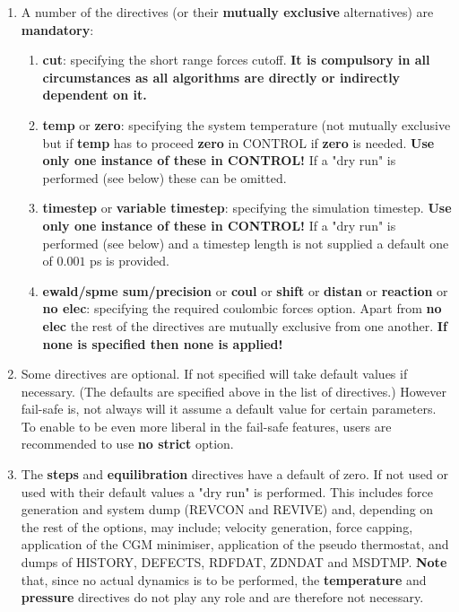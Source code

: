 \begin{enumerate}
\item A number of the directives (or their {\bf mutually
exclusive} alternatives) are {\bf mandatory}:
\begin{enumerate}
\item {\bf cut}: specifying the short range forces cutoff.  {\bf
It is compulsory in all circumstances as all \D algorithms are
directly or indirectly dependent on it.}
\item {\bf temp} or {\bf zero}: specifying the system temperature
(not mutually exclusive but if {\bf temp} has to proceed
{\bf zero} in CONTROL if {\bf zero} is needed.  {\bf Use only one
instance of these in CONTROL!}  If a "dry run" is performed (see
below) these can be omitted.
\item {\bf timestep} or {\bf variable timestep}: specifying the
simulation timestep.  {\bf Use only one instance of these in
CONTROL!} If a "dry run" is performed (see below) and a timestep
length is not supplied a default one of $0.001$ ps is provided.
\item {\bf ewald/spme sum/precision} 
or {\bf coul} or {\bf shift} or {\bf distan} or {\bf reaction}
or {\bf no elec}: specifying the required coulombic forces
option.  Apart from {\bf no elec} the rest of the directives are
mutually exclusive from one another.  {\bf If none is specified
then none is applied!}
\end{enumerate}

\item Some directives are optional.  If not specified \D will take
default values if necessary.  (The defaults are specified above in
the list of directives.)  However fail-safe \D is, not always will
it assume a default value for certain parameters.  To enable \D to
be even more liberal in the fail-safe features, users are recommended
to use {\bf no strict} option.

\item The {\bf steps} and {\bf equilibration} directives have a
default of zero.  If not used or used with their default values a
"dry run" is performed.  This includes force generation and system
dump (REVCON and REVIVE) and, depending on the rest of the options,
may include; velocity generation, force capping, application of the
CGM minimiser, application of the pseudo thermostat, and dumps of
HISTORY, DEFECTS, RDFDAT, ZDNDAT and MSDTMP.  {\bf Note} that, since
no actual dynamics is to be performed, the {\bf temperature} and
{\bf pressure} directives do not play any role and are therefore
not necessary.


\end{enumerate}
